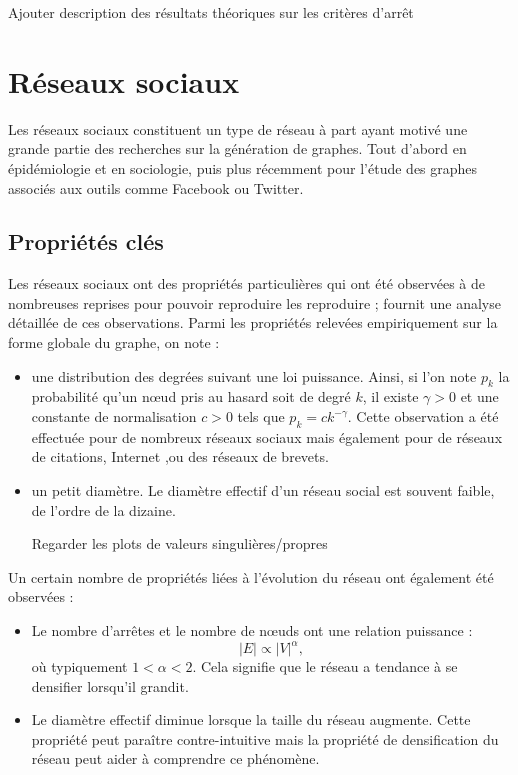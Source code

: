 \documentclass[a4paper]{article}
\begin{document}
\begin{todo}
Ajouter description des résultats théoriques sur les critères d'arrêt
\end{todo}

\section{Réseaux sociaux}
\label{sec:reseaux_sociaux}
    Les réseaux sociaux constituent un type de réseau à part ayant motivé une
    grande partie des recherches sur la génération de graphes. Tout d'abord en
    épidémiologie et en sociologie, puis plus récemment pour l'étude des
    graphes associés aux outils comme Facebook ou Twitter.

    \subsection{Propriétés clés}
    \label{sub:proprietes_cles}
        Les réseaux sociaux ont des propriétés particulières qui ont été
        observées à de nombreuses reprises pour pouvoir reproduire les
        reproduire ; \cite{Leskovec:2007:GED:1217299.1217301} fournit une
        analyse détaillée de ces observations. Parmi les propriétés relevées
        empiriquement sur la forme globale du graphe, on note :
        \begin{itemize}
            \item une distribution des degrées suivant une loi puissance.
                Ainsi, si l'on note $p_k$ la probabilité qu'un n\oe{}ud pris au
                hasard soit de degré $k$, il existe $\gamma > 0$ et une
                constante de normalisation $c > 0$ tels que
                $p_k = ck^{-\gamma}$. Cette observation a été effectuée pour de
                nombreux réseaux sociaux mais également pour de réseaux de
                citations, Internet \cite{chen2002origin},ou des réseaux de
                brevets.
            \item un petit diamètre. Le diamètre effectif d'un réseau social
                est souvent faible, de l'ordre de la dizaine.
\begin{todo}
Regarder les plots de valeurs singulières/propres
\end{todo}
        \end{itemize}
        Un certain nombre de propriétés liées à l'évolution du réseau ont
        également été observées :
        \begin{itemize}
            \item Le nombre d'arrêtes et le nombre de n\oe{}uds ont une
                relation puissance :
                \[
                    |E| \propto |V|^{\alpha},
                \]
                où typiquement $1 < \alpha < 2$. Cela signifie que le réseau a
                tendance à se densifier lorsqu'il grandit.
            \item Le diamètre effectif diminue lorsque la taille du réseau
                augmente. Cette propriété peut paraître contre-intuitive
                mais la propriété de densification du réseau peut aider à
                comprendre ce phénomène.
        \end{itemize}
\end{document}
